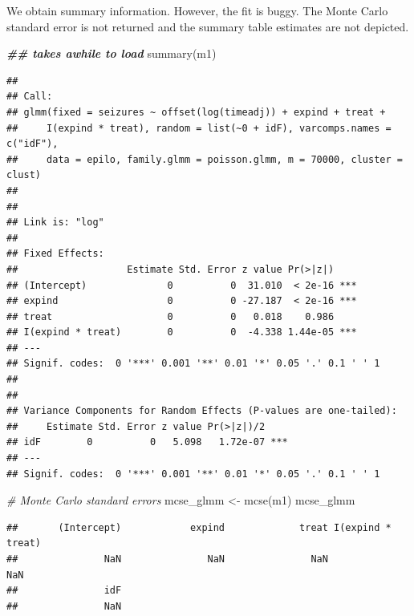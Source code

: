 \documentclass[
  ignorenonframetext,
]{beamer}
\newenvironment{Shaded}{\begin{snugshade}}{\end{snugshade}}
\newcommand{\CommentTok}[1]{\textcolor[rgb]{0.56,0.35,0.01}{\textit{#1}}}
\newcommand{\DocumentationTok}[1]{\textcolor[rgb]{0.56,0.35,0.01}{\textbf{\textit{#1}}}}
\newcommand{\FunctionTok}[1]{\textcolor[rgb]{0.00,0.00,0.00}{#1}}
\newcommand{\NormalTok}[1]{#1}
\newcommand{\OtherTok}[1]{\textcolor[rgb]{0.56,0.35,0.01}{#1}}
\begin{document}
\begin{frame}[fragile]{}
\protect\hypertarget{section-14}{}
We obtain summary information. However, the fit is buggy. The Monte
Carlo standard error is not returned and the summary table estimates are
not depicted.

\vspace{12pt}
\tiny

\begin{Shaded}
\begin{Highlighting}[]
\DocumentationTok{\#\# takes awhile to load}
\FunctionTok{summary}\NormalTok{(m1)}
\end{Highlighting}
\end{Shaded}

\begin{verbatim}
## 
## Call:
## glmm(fixed = seizures ~ offset(log(timeadj)) + expind + treat + 
##     I(expind * treat), random = list(~0 + idF), varcomps.names = c("idF"), 
##     data = epilo, family.glmm = poisson.glmm, m = 70000, cluster = clust)
## 
## 
## Link is: "log"
## 
## Fixed Effects:
##                   Estimate Std. Error z value Pr(>|z|)    
## (Intercept)              0          0  31.010  < 2e-16 ***
## expind                   0          0 -27.187  < 2e-16 ***
## treat                    0          0   0.018    0.986    
## I(expind * treat)        0          0  -4.338 1.44e-05 ***
## ---
## Signif. codes:  0 '***' 0.001 '**' 0.01 '*' 0.05 '.' 0.1 ' ' 1
## 
## 
## Variance Components for Random Effects (P-values are one-tailed):
##     Estimate Std. Error z value Pr(>|z|)/2    
## idF        0          0   5.098   1.72e-07 ***
## ---
## Signif. codes:  0 '***' 0.001 '**' 0.01 '*' 0.05 '.' 0.1 ' ' 1
\end{verbatim}
\end{frame}

\begin{frame}[fragile]{}
\protect\hypertarget{section-15}{}
\tiny

\begin{Shaded}
\begin{Highlighting}[]
\CommentTok{\# Monte Carlo standard errors}
\NormalTok{mcse\_glmm }\OtherTok{\textless{}{-}} \FunctionTok{mcse}\NormalTok{(m1)}
\NormalTok{mcse\_glmm}
\end{Highlighting}
\end{Shaded}

\begin{verbatim}
##       (Intercept)            expind             treat I(expind * treat) 
##               NaN               NaN               NaN               NaN 
##               idF 
##               NaN
\end{verbatim}
\end{frame}
\end{document}
